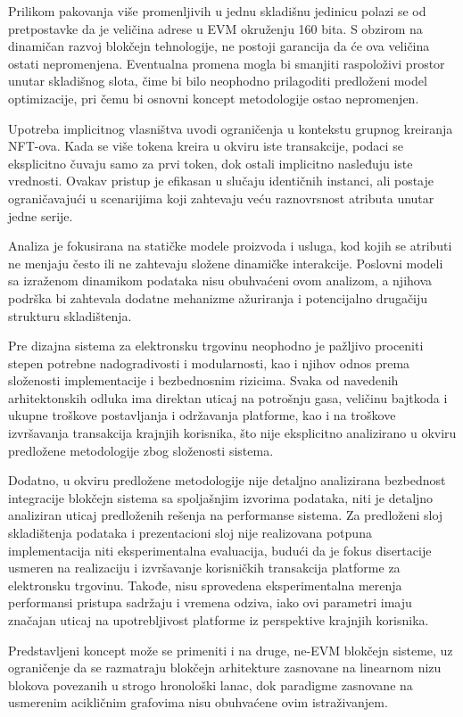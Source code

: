 Prilikom pakovanja više promenljivih u jednu skladišnu jedinicu polazi se od pretpostavke da je veličina adrese u EVM okruženju 160 bita. S obzirom na dinamičan razvoj blokčejn tehnologije, ne postoji garancija da će ova veličina ostati nepromenjena. Eventualna promena mogla bi smanjiti raspoloživi prostor unutar skladišnog slota, čime bi bilo neophodno prilagoditi predloženi model optimizacije, pri čemu bi osnovni koncept metodologije ostao nepromenjen.

Upotreba implicitnog vlasništva uvodi ograničenja u kontekstu grupnog kreiranja NFT-ova. Kada se više tokena kreira u okviru iste transakcije, podaci se eksplicitno čuvaju samo za prvi token, dok ostali implicitno nasleđuju iste vrednosti. Ovakav pristup je efikasan u slučaju identičnih instanci, ali postaje ograničavajući u scenarijima koji zahtevaju veću raznovrsnost atributa unutar jedne serije.

Analiza je fokusirana na statičke modele proizvoda i usluga, kod kojih se atributi ne menjaju često ili ne zahtevaju složene dinamičke interakcije. Poslovni modeli sa izraženom dinamikom podataka nisu obuhvaćeni ovom analizom, a njihova podrška bi zahtevala dodatne mehanizme ažuriranja i potencijalno drugačiju strukturu skladištenja.

Pre dizajna sistema za elektronsku trgovinu neophodno je pažljivo proceniti stepen potrebne nadogradivosti i modularnosti, kao i njihov odnos prema složenosti implementacije i bezbednosnim rizicima. Svaka od navedenih arhitektonskih odluka ima direktan uticaj na potrošnju gasa, veličinu bajtkoda i ukupne troškove postavljanja i održavanja platforme, kao i na troškove izvršavanja transakcija krajnjih korisnika, što nije eksplicitno analizirano u okviru predložene metodologije zbog složenosti sistema.

Dodatno, u okviru predložene metodologije nije detaljno analizirana bezbednost integracije blokčejn sistema sa spoljašnjim izvorima podataka, niti je detaljno analiziran uticaj predloženih rešenja na performanse sistema. Za predloženi sloj skladištenja podataka i prezentacioni sloj nije realizovana potpuna implementacija niti eksperimentalna evaluacija, budući da je fokus disertacije usmeren na realizaciju i izvršavanje korisničkih transakcija platforme za elektronsku trgovinu. Takođe, nisu sprovedena eksperimentalna merenja performansi pristupa sadržaju i vremena odziva, iako ovi parametri imaju značajan uticaj na upotrebljivost platforme iz perspektive krajnjih korisnika.

Predstavljeni koncept može se primeniti i na druge, ne-EVM blokčejn sisteme, uz ograničenje da se razmatraju blokčejn arhitekture zasnovane na linearnom nizu blokova povezanih u strogo hronološki lanac, dok paradigme zasnovane na usmerenim acikličnim grafovima nisu obuhvaćene ovim istraživanjem.

